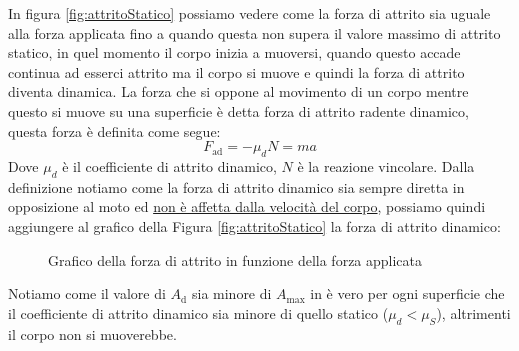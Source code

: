         In figura \ref{fig:attritoStatico} possiamo vedere come la forza di attrito sia uguale alla forza applicata fino a quando questa non supera il valore massimo di attrito statico, in quel momento il corpo inizia a muoversi, quando questo accade continua ad esserci attrito ma il corpo si muove e quindi la forza di attrito diventa dinamica.\newline
        La forza che si oppone al movimento di un corpo mentre questo si muove su una superficie è detta forza di attrito radente dinamico, questa forza è definita come segue:
        $$
            F_{\text{ad}} = -\mu_d N = ma
        $$
        Dove $\mu_d$ è il coefficiente di attrito dinamico, $N$ è la reazione vincolare. Dalla definizione notiamo come la forza di attrito dinamico sia sempre diretta in opposizione al moto ed \underline{non è affetta dalla velocità del corpo}, possiamo quindi aggiungere al grafico della Figura \ref{fig:attritoStatico} la forza di attrito dinamico:
        \begin{figure}[H]
            \centering
            \caption{Grafico della forza di attrito in funzione della forza applicata}
            \label{fig:attritoDinamico}
        \end{figure}
        Notiamo come il valore di $A_{\text{d}}$ sia minore di $A_{\text{max}}$ in è vero per ogni superficie che il coefficiente di attrito dinamico sia minore di quello statico ($\mu_d < \mu_S$), altrimenti il corpo non si muoverebbe.
